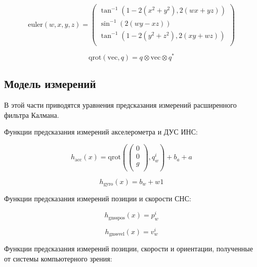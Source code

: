 \documentclass[12pt,a4paper]{article}
\begin{document}
\begin{equation}
    \label{eq:euler}
    \text{euler}(w,x,y,z)=\left(
    \begin{array}{c}
    \tan ^{-1}\left(1-2 \left(x^2+y^2\right),2 (w x+y z)\right) \\
    \sin ^{-1}(2 (w y-x z)) \\
    \tan ^{-1}\left(1-2 \left(y^2+z^2\right),2 (x y+w z)\right) \\
    \end{array}
    \right)
\end{equation}

\begin{equation}
    \label{eq:qrot}
    \text{qrot}(\text{vec},q)=q\otimes \text{vec}\otimes q^*
\end{equation}

\subsection{Модель измерений}

В этой части приводятся уравнения предсказания измерений расширенного фильтра Калмана.

Функции предсказания измерений акселерометра и ДУС ИНС:

\begin{equation}
    h_{\text{acc}}(x)=\text{qrot}\left(\left(
    \begin{array}{c}
    0 \\
    0 \\
    g \\
    \end{array}
    \right),q_w^i\right)+b_a+a
\end{equation}

\begin{equation}
    h_{\text{gyro}}(x)=b_w+w1
\end{equation}

Функции предсказания измерений позиции и скорости СНС:

\begin{equation}
    h_{\text{gnsspos}}(x)=p_w^i
\end{equation}

\begin{equation}
    h_{\text{gnssvel}}(x)=v_w^i
\end{equation}

Функции предсказания измерений позиции, скорости и ориентации, полученные от системы компьютерного зрения:
\end{document}
